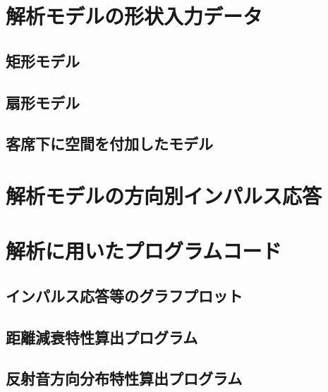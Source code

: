 \chapter{解析モデルの形状入力データ}
\section{矩形モデル}
\section{扇形モデル}
\section{客席下に空間を付加したモデル}
\chapter{解析モデルの方向別インパルス応答}


\chapter{解析に用いたプログラムコード}
\section{インパルス応答等のグラフプロット}
\section{距離減衰特性算出プログラム}
\section{反射音方向分布特性算出プログラム}